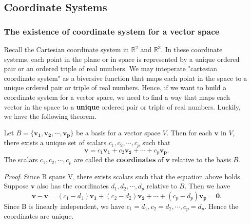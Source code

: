 \documentclass[10pt, a4paper]{article}
\newcommand{\R}{\mathbb{R}}
\newcommand{\vt}[1]{\mathbf{#1}}
\begin{document}
\subsection{Coordinate Systems}
\subsubsection*{The existence of coordinate system for a vector space}
Recall the Cartesian coordinate system in $\R^2$ and $\R^3$. In these coordinate systems, each point in the plane or in space is represented by a unique ordered pair or an ordered triple of real numbers.
We may inteperate "cartesian coordinate system" as a biversive function that maps each point in the space to a unique ordered pair or triple of real numbers. Hence, if we want to build a coordinate system for a vector space, we need to find a way that maps each vector in the space to a \textbf{unique} ordered pair or triple of real numbers.
Luckily, we have the following theorem.
\begin{proposition}
    Let $B=\{\vt{v_1}, \vt{v_2}, \cdots, \vt{v_p}\}$ be a basis for a vector space $V$. Then for each $\vt{v}$ in $V$, there exists a unique set of scalars $c_1, c_2, \cdots, c_p$ such that \[
    \vt{v} = c_1\vt{v_1} + c_2\vt{v_2} + \cdots + c_p\vt{v_p}.
    \]
    The scalars $c_1, c_2, \cdots, c_p$ are called the \textbf{coordinates} of $\vt{v}$ relative to the basis $B$.
\end{proposition}
\indent\textit{Proof.} Since B spans V, there exists scalars such that the equation above holds. Suppose $\vt{v}$ also has the coordinates $d_1, d_2, \cdots, d_p$ relative to $B$. Then we have \[
\vt{v}-\vt{v} = (c_1-d_1)\vt{v_1} + (c_2-d_2)\vt{v_2} + \cdots + (c_p-d_p)\vt{v_p} = \vt{0}.
\]
Since B is linearly independent, we have $c_1=d_1, c_2=d_2, \cdots, c_p=d_p$. Hence the coordinates are unique.\\
\end{document}
